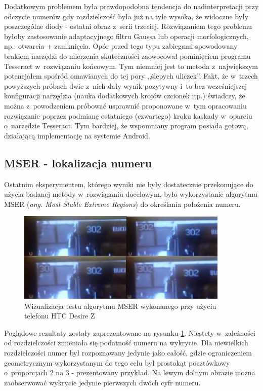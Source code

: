 Dodatkowym problemem była prawdopodobna tendencja do nadinterpretacji
przy odczycie numerów gdy rozdzielczość była już na tyle wysoka, że
widoczne były poszczególne diody - ostatni obraz z~serii trzeciej.
Rozwiązaniem tego problemu byłoby zastosowanie adaptacyjnego filtru
Gaussa lub operacji morfologicznych, np.: otwarcia + zamknięcia.
Opór przed tego typu zabiegami spowodowany brakiem narzędzi 
do mierzenia skuteczności zaowocował pominięciem programu Tesseract
w~rozwiązaniu końcowym. Tym niemniej jest to metoda z~największym
potencjałem spośród omawianych do tej pory ,,ślepych uliczek''. 
Fakt, że w~trzech powyższych próbach dwie z~nich dały wynik pozytywny
i~to bez wcześniejszej konfiguracji narzędzia (nauka dodatkowych
krojów czcionek itp.) świadczy, że można z~powodzeniem próbować
usprawnić proponowane w~tym opracowaniu rozwiązanie poprzez 
podmianę ostatniego (czwartego) kroku kaskady w~oparciu o~narzędzie
Tesseract. Tym bardziej, że wspomniany program posiada gotową, działającą
implementację na systemie Android.

\subsection{MSER - lokalizacja numeru}

Ostatnim eksperymentem, którego wyniki nie były dostatecznie przekonujące
do użycia badanej metody w~rozwiązaniu docelowym, było
wykorzystanie algorytmu MSER (\textit{ang. Most Stable Extreme Regions})
do określania położenia numeru.

\begin{figure}[h!]
    \centering
    \includegraphics[width=0.9\textwidth]{img/exp_mser_concerns}
    \caption{Wizualizacja testu algorytmu MSER wykonanego przy użyciu telefonu HTC Desire Z}
    \label{fig:mser_example_results}
\end{figure}

Poglądowe rezultaty zostały zaprezentowane na rysunku
\ref{fig:mser_example_results}.
Niestety w~zależności od rozdzielczości zmieniała się podatność
numeru na wykrycie. Dla niewielkich rozdzielczości numer był rozpoznawany
jedynie jako całość, gdzie ograniczeniem geometrycznym wykorzystanym
do tego celu był prostokąt pocztówkowy o~proporcjach 2 na 3 - prezentowany
przykład. Na lewym dolnym obrazie można zaobserwować wykrycie jedynie
pierwszych dwóch cyfr numeru.

